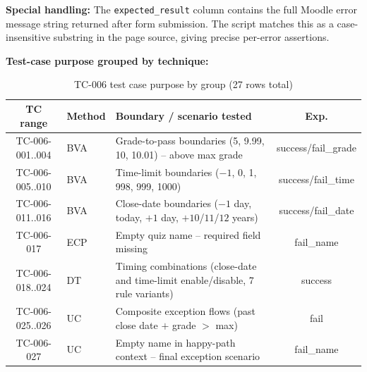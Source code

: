 \documentclass[twoside,final]{hcmut-report}
\begin{document}
\textbf{Special handling:} The \texttt{expected\_result} column contains the full Moodle error message string returned after form submission. The script matches this as a case-insensitive substring in the page source, giving precise per-error assertions.

\textbf{Test-case purpose grouped by technique:}
\begin{table}[H]
\centering
\renewcommand{\arraystretch}{1.2}
\begin{tabularx}{\textwidth}{|c|l|X|c|}
\hline
\textbf{TC range} & \textbf{Method} & \textbf{Boundary / scenario tested} & \textbf{Exp.} \\ \hline
TC-006-001..004 & BVA & Grade-to-pass boundaries (5, 9.99, 10, 10.01) -- above max grade & success/fail\_grade \\ \hline
TC-006-005..010 & BVA & Time-limit boundaries ($-1$, 0, 1, 998, 999, 1000) & success/fail\_time \\ \hline
TC-006-011..016 & BVA & Close-date boundaries ($-1$ day, today, $+1$ day, $+10$/$11$/$12$ years) & success/fail\_date \\ \hline
TC-006-017 & ECP & Empty quiz name -- required field missing & fail\_name \\ \hline
TC-006-018..024 & DT & Timing combinations (close-date and time-limit enable/disable, 7 rule variants) & success \\ \hline
TC-006-025..026 & UC & Composite exception flows (past close date $+$ grade $>$ max) & fail \\ \hline
TC-006-027 & UC & Empty name in happy-path context -- final exception scenario & fail\_name \\ \hline
\end{tabularx}
\caption{TC-006 test case purpose by group (27 rows total)}
\end{table}
\end{document}
